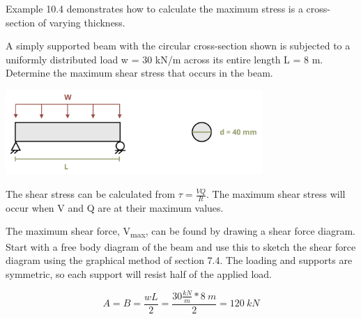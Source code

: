 \documentclass[
  letterpaper,
  DIV=11,
  numbers=noendperiod]{scrreprt}
\theoremstyle{definition}
\theoremstyle{remark}
\begin{document}
Example 10.4 demonstrates how to calculate the maximum stress is a
cross-section of varying thickness.

\begin{tcolorbox}[enhanced jigsaw, leftrule=.75mm, colbacktitle=quarto-callout-tip-color!10!white, breakable, opacityback=0, colback=white, titlerule=0mm, toprule=.15mm, colframe=quarto-callout-tip-color-frame, coltitle=black, title={Example 10.3}, toptitle=1mm, bottomrule=.15mm, rightrule=.15mm, left=2mm, arc=.35mm, opacitybacktitle=0.6, bottomtitle=1mm]

A simply supported beam with the circular cross-section shown is
subjected to a uniformly distributed load w = 30 kN/m across its entire
length L = 8 m. Determine the maximum shear stress that occurs in the
beam.

\begin{center}
\includegraphics[width=3.83333in,height=\textheight]{images/CH10 PNGs/example 10.3 part 1.png}
\end{center}

\begin{tcolorbox}[enhanced jigsaw, leftrule=.75mm, colbacktitle=quarto-callout-tip-color!10!white, breakable, opacityback=0, colback=white, titlerule=0mm, toprule=.15mm, colframe=quarto-callout-tip-color-frame, coltitle=black, title={Solution}, toptitle=1mm, bottomrule=.15mm, rightrule=.15mm, left=2mm, arc=.35mm, opacitybacktitle=0.6, bottomtitle=1mm]

The shear stress can be calculated from \(\tau=\frac{V Q}{I t}\). The
maximum shear stress will occur when V and Q are at their maximum
values.

The maximum shear force, V\textsubscript{max}, can be found by drawing a
shear force diagram. Start with a free body diagram of the beam and use
this to sketch the shear force diagram using the graphical method of
section 7.4. The loading and supports are symmetric, so each support
will resist half of the applied load.

\[
A=B=\frac{w L}{2}=\frac{30\frac{kN}{m} * 8{~m}}{2}=120{~kN}
\]


\end{tcolorbox}
\end{tcolorbox}
\end{document}
